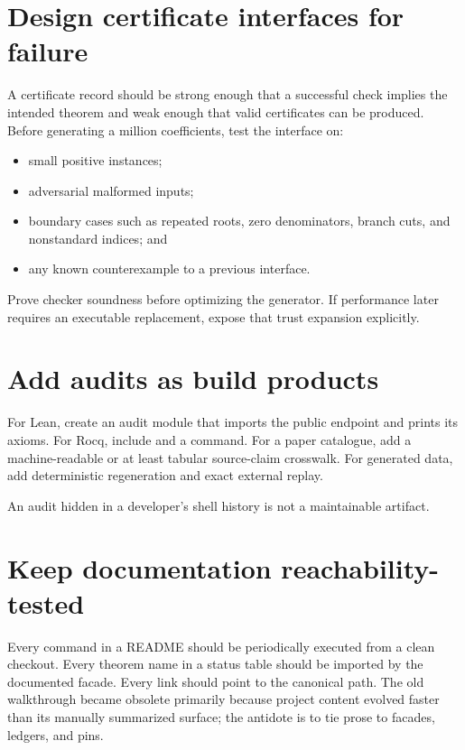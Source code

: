 \documentclass[
  10pt,
  a4paper,
  twoside,
  open=any,
  parskip=half,
  headings=big
]{scrreprt}
\newcommand{\code}[1]{\texttt{\detokenize{#1}}}
\begin{document}
\section{Design certificate interfaces for failure}

A certificate record should be strong enough that a successful check implies the intended theorem and weak enough that valid certificates can be produced. Before generating a million coefficients, test the interface on:

\begin{itemize}
  \item small positive instances;
  \item adversarial malformed inputs;
  \item boundary cases such as repeated roots, zero denominators, branch cuts, and nonstandard indices; and
  \item any known counterexample to a previous interface.
\end{itemize}

Prove checker soundness before optimizing the generator. If performance later requires an executable replacement, expose that trust expansion explicitly.

\section{Add audits as build products}

For Lean, create an audit module that imports the public endpoint and prints its axioms. For Rocq, include \code{Print Assumptions} and a \code{coqchk} command. For a paper catalogue, add a machine-readable or at least tabular source-claim crosswalk. For generated data, add deterministic regeneration and exact external replay.

An audit hidden in a developer's shell history is not a maintainable artifact.

\section{Keep documentation reachability-tested}

Every command in a README should be periodically executed from a clean checkout. Every theorem name in a status table should be imported by the documented facade. Every link should point to the canonical path. The old walkthrough became obsolete primarily because project content evolved faster than its manually summarized surface; the antidote is to tie prose to facades, ledgers, and pins.
\end{document}
